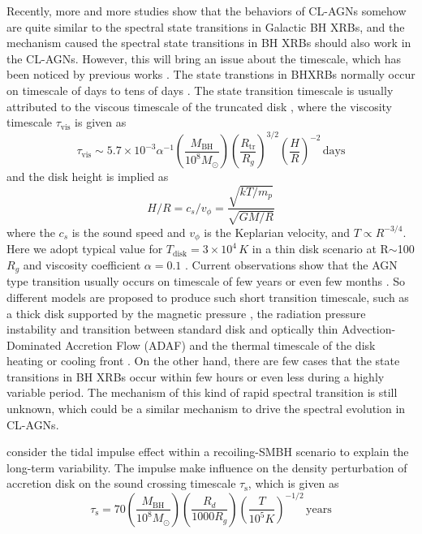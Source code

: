 \documentclass[twocolumn]{aastex63}
\begin{document}
Recently, more and more studies show that the behaviors of CL-AGNs somehow are quite similar to the spectral state transitions in Galactic BH XRBs, and the mechanism caused the spectral state transitions in BH XRBs should also work in the CL-AGNs. However, this will bring an issue about the timescale, which has been noticed by previous works \citep[e.g. ][]{2018NatAs...2..102L,2018ApJ...864...27S,2018MNRAS.480.3898N,2020MNRAS.492.2335L}. The state transtions in BHXRBs normally occur on timescale of days to tens of days \citep{2009ApJ...701.1940Y,2010MNRAS.403...61D}. The state transition timescale is usually
attributed to the viscous timescale of the truncated disk \citep[see reviews in ][]{2007A&ARv..15....1D}, where the viscosity timescale $\tau_\mathrm{vis}$ is given as
\begin{equation}
\tau_\mathrm{vis} \sim 5.7\times 10^{-3} \alpha^{-1}(\frac{M_\mathrm{BH}}{10^8M_{\odot}})(\frac{R_\mathrm{tr}}{R_g})^{3/2} (\frac{H}{R})^{-2} \, \mathrm{days} \end{equation} 
and the disk height is implied as
\begin{equation}
H/R = c_s/v_{\phi}=\frac{\sqrt{kT/m_p}}{\sqrt{GM/R}}
\end{equation} 
where the $c_s$ is the sound speed and $v_{\phi}$ is the Keplarian velocity, and $T\propto R^{-3/4}$. Here we adopt typical value for $T_\mathrm{disk}=3\times10^4\, K$ in a thin disk scenario at R$\sim$100$R_g$ and viscosity coefficient $\alpha=0.1$ \citep[see also][]{2018MNRAS.480.3898N}. Current observations show that the AGN type transition usually occurs on timescale of few years \citep[e.g.][]{2016A&A...593L...8M,2018ApJ...864...27S,2019MNRAS.483L..88P,2020MNRAS.492.2335L} or even few months \citep{2019ApJ...883...94T}. So different models are proposed to produce such short transition timescale, such as a thick disk supported by the magnetic pressure \citep{2019MNRAS.483L..17D}, the radiation pressure instability and  transition between standard disk and optically thin Advection-Dominated
Accretion Flow (ADAF) \citep{2019arXiv190406767S} and the thermal timescale of the disk heating or cooling front \citep{2018ApJ...864...27S}. On the other hand, there are few cases that the state transitions in BH XRBs occur within few hours or even less \citep[e.g.][]{2011A&A...533A...8B,2020A&A...634A..94K} during a highly variable period. The mechanism of this kind of rapid spectral transition is still unknown, which could be a similar mechanism to drive the spectral evolution in CL-AGNs.

\citet{2018ApJ...861...51K} consider the tidal impulse effect within a recoiling-SMBH scenario to explain the long-term variability. The impulse make influence on the density perturbation of accretion disk on the sound crossing timescale $\tau_\mathrm{s}$, which is given as
\begin{equation}
\tau_\mathrm{s}= 70 (\frac{M_\mathrm{BH}}{10^8M_{\odot}})(\frac{R_d}{1000 R_g}) (\frac{T}{10^5 K})^{-1/2} \, \mathrm{years}
\end{equation}
\end{document}
